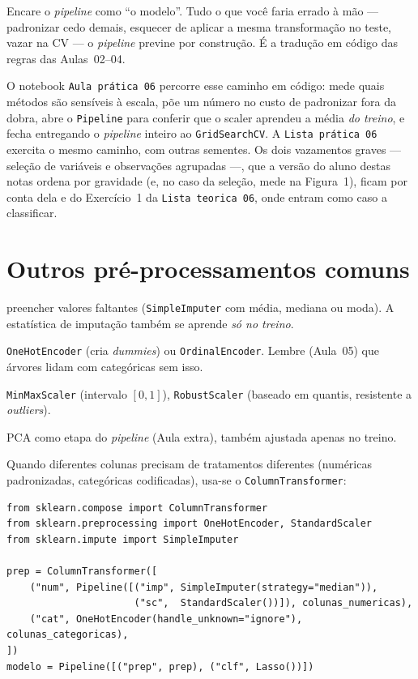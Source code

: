 \documentclass[11pt,a4paper]{article}
\begin{document}
\begin{ideia}
Encare o \emph{pipeline} como ``o modelo''. Tudo o que você faria errado à mão ---
padronizar cedo demais, esquecer de aplicar a mesma transformação no teste, vazar
na CV --- o \emph{pipeline} previne por construção. É a tradução em código das regras
das Aulas~02--04.
\end{ideia}

O notebook \texttt{Aula prática 06} percorre esse caminho em código: mede quais
métodos são sensíveis à escala, põe um número no custo de padronizar fora da
dobra, abre o \texttt{Pipeline} para conferir que o scaler aprendeu a média
\emph{do treino}, e fecha entregando o \emph{pipeline} inteiro ao
\texttt{GridSearchCV}. A \texttt{Lista prática 06} exercita o mesmo caminho, com
outras sementes. Os dois vazamentos graves --- seleção de variáveis e observações
agrupadas ---, que a versão do aluno destas notas ordena por gravidade (e, no caso da
seleção, mede na Figura~1), ficam por conta dela e do Exercício~1 da
\texttt{Lista teorica 06}, onde entram como caso a classificar.

\section{Outros pré-processamentos comuns}
\begin{description}[leftmargin=2.6cm,style=nextline]
  \item[Imputação] preencher valores faltantes (\texttt{SimpleImputer} com média,
        mediana ou moda). A estatística de imputação também se aprende \emph{só no
        treino}.
  \item[Codificação de categóricas] \texttt{OneHotEncoder} (cria \emph{dummies}) ou
        \texttt{OrdinalEncoder}. Lembre (Aula~05) que árvores lidam com categóricas
        sem isso.
  \item[Escalas alternativas] \texttt{MinMaxScaler} (intervalo $[0,1]$),
        \texttt{RobustScaler} (baseado em quantis, resistente a \emph{outliers}).
  \item[Redução de dimensão] PCA como etapa do \emph{pipeline} (Aula extra),
        também ajustada apenas no treino.
\end{description}

Quando diferentes colunas precisam de tratamentos diferentes (numéricas
padronizadas, categóricas codificadas), usa-se o \texttt{ColumnTransformer}:
\begin{lstlisting}
from sklearn.compose import ColumnTransformer
from sklearn.preprocessing import OneHotEncoder, StandardScaler
from sklearn.impute import SimpleImputer

prep = ColumnTransformer([
    ("num", Pipeline([("imp", SimpleImputer(strategy="median")),
                      ("sc",  StandardScaler())]), colunas_numericas),
    ("cat", OneHotEncoder(handle_unknown="ignore"), colunas_categoricas),
])
modelo = Pipeline([("prep", prep), ("clf", Lasso())])
\end{lstlisting}
\end{document}
